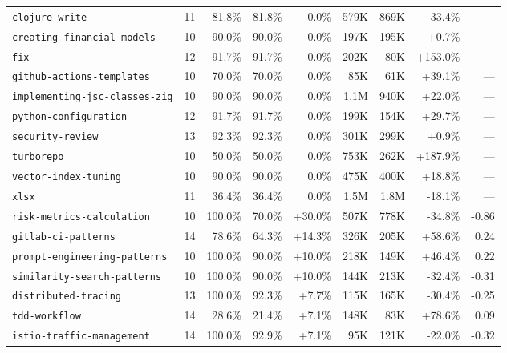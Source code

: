 \documentclass{article}
\begin{document}
\begin{table}[t]
{\begin{tabular}{l c r r r r r r r}
  \texttt{clojure-write} & 11 & 81.8\% & 81.8\% & 0.0\% & 579K & 869K & \cellcolor{green!10}-33.4\% & --- \\
  \texttt{creating-financial-models} & 10 & 90.0\% & 90.0\% & 0.0\% & 197K & 195K & +0.7\% & --- \\
  \texttt{fix} & 12 & 91.7\% & 91.7\% & 0.0\% & 202K & 80K & \cellcolor{red!10}+153.0\% & --- \\
  \texttt{github-actions-templates} & 10 & 70.0\% & 70.0\% & 0.0\% & 85K & 61K & \cellcolor{red!10}+39.1\% & --- \\
  \texttt{implementing-jsc-classes-zig} & 10 & 90.0\% & 90.0\% & 0.0\% & 1.1M & 940K & \cellcolor{red!10}+22.0\% & --- \\
  \texttt{python-configuration} & 12 & 91.7\% & 91.7\% & 0.0\% & 199K & 154K & \cellcolor{red!10}+29.7\% & --- \\
  \texttt{security-review} & 13 & 92.3\% & 92.3\% & 0.0\% & 301K & 299K & +0.9\% & --- \\
  \texttt{turborepo} & 10 & 50.0\% & 50.0\% & 0.0\% & 753K & 262K & \cellcolor{red!10}+187.9\% & --- \\
  \texttt{vector-index-tuning} & 10 & 90.0\% & 90.0\% & 0.0\% & 475K & 400K & \cellcolor{red!10}+18.8\% & --- \\
  \texttt{xlsx} & 11 & 36.4\% & 36.4\% & 0.0\% & 1.5M & 1.8M & \cellcolor{green!10}-18.1\% & --- \\
\midrule
  \texttt{risk-metrics-calculation} & 10 & 100.0\% & 70.0\% & \cellcolor{green!15}+30.0\% & 507K & 778K & \cellcolor{green!10}-34.8\% & -0.86 \\
  \texttt{gitlab-ci-patterns} & 14 & 78.6\% & 64.3\% & \cellcolor{green!15}+14.3\% & 326K & 205K & \cellcolor{red!10}+58.6\% & 0.24 \\
  \texttt{prompt-engineering-patterns} & 10 & 100.0\% & 90.0\% & \cellcolor{green!15}+10.0\% & 218K & 149K & \cellcolor{red!10}+46.4\% & 0.22 \\
  \texttt{similarity-search-patterns} & 10 & 100.0\% & 90.0\% & \cellcolor{green!15}+10.0\% & 144K & 213K & \cellcolor{green!10}-32.4\% & -0.31 \\
  \texttt{distributed-tracing} & 13 & 100.0\% & 92.3\% & \cellcolor{green!15}+7.7\% & 115K & 165K & \cellcolor{green!10}-30.4\% & -0.25 \\
  \texttt{tdd-workflow} & 14 & 28.6\% & 21.4\% & \cellcolor{green!15}+7.1\% & 148K & 83K & \cellcolor{red!10}+78.6\% & 0.09 \\
  \texttt{istio-traffic-management} & 14 & 100.0\% & 92.9\% & \cellcolor{green!15}+7.1\% & 95K & 121K & \cellcolor{green!10}-22.0\% & -0.32 \\

\end{tabular}}
\end{table}
\end{document}
